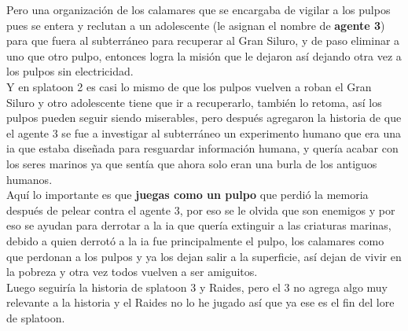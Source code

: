 \documentclass{article}
\begin{document}
Pero una organización de los calamares que se encargaba de vigilar a los pulpos pues se entera y reclutan a un adolescente (le asignan el nombre de \textbf{agente 3}) para que fuera al subterráneo para recuperar al Gran Siluro, y de paso eliminar a uno que otro pulpo, entonces logra la misión que le dejaron así dejando otra vez a los pulpos sin electricidad.\\

Y en splatoon 2 es casi lo mismo de que los pulpos vuelven a roban el Gran Siluro y otro adolescente tiene que ir a recuperarlo, también lo retoma, así los pulpos pueden seguir siendo miserables, pero después agregaron la historia de que el agente 3 se fue a investigar al subterráneo un experimento humano que era una ia que estaba diseñada para resguardar información humana, y quería acabar con los seres marinos ya que sentía que ahora solo eran una burla de los antiguos humanos.\\

Aquí lo importante es que \textbf{juegas como un pulpo} que perdió la memoria después de pelear contra el agente 3, por eso se le olvida que son enemigos y por eso se ayudan para derrotar a la ia que quería extinguir a las criaturas marinas, debido a quien derrotó a la ia fue principalmente el pulpo, los calamares como que perdonan a los pulpos y ya los dejan salir a la superficie, así dejan de vivir en la pobreza y otra vez todos vuelven a ser amiguitos.\\

Luego seguiría la historia de splatoon 3 y Raides, pero el 3 no agrega algo muy relevante a la historia y el Raides no lo he jugado así que ya ese es el fin del lore de splatoon.
\end{document}
